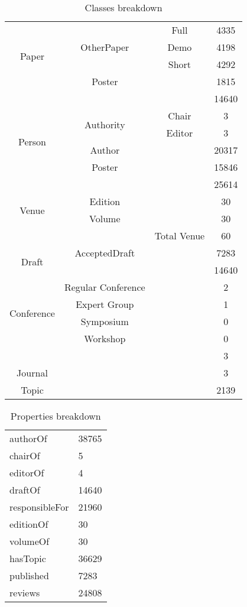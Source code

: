 \documentclass[12pt, a4paper]{article}
\begin{document}
\begin{table}[H]
  \centering
  \begin{tabular}{cccc}
    \multirow{4}{*}{Paper}&\multirow{3}{*}{OtherPaper}& Full & 4335\\
    &&Demo & 4198\\
    &&Short & 4292\\
    &  Poster & & 1815\\
    &&& 14640\\
    \hline
    \multirow{4}{*}{Person}&\multirow{2}{*}{Authority}& Chair & 3\\
    &&Editor & 3\\
    & Author & & 20317\\
    & Poster & & 15846\\
    &&&25614\\
    \hline
    \multirow{2}{*}{Venue} & Edition & & 30\\
    & Volume & & 30\\
    && Total Venue &60\\
    \hline
    \multirow{2}{*}{Draft} & AcceptedDraft & & 7283\\
    & && 14640\\
    \hline
    \multirow{4}{*}{Conference} & Regular Conference & & 2\\
    & Expert Group & & 1\\
    & Symposium & & 0\\
    & Workshop & & 0 \\
    &&& 3\\
    \hline
    Journal & & & 3\\
    \hline
    Topic & & & 2139\\
  \end{tabular}
  \caption{Classes breakdown}
  \label{table:summary2.1}
\end{table}

\begin{table}[H]
  \centering
  \begin{tabular}{ll}
    authorOf & 38765 \\
    chairOf & 5\\
    editorOf & 4\\
    draftOf & 14640\\
    responsibleFor & 21960\\
    editionOf & 30\\
    volumeOf & 30\\
    hasTopic & 36629\\
    published & 7283 \\
    reviews & 24808 \\
  \end{tabular}
  \caption{Properties breakdown}
  \label{table:summary3}
\end{table}
\end{document}
